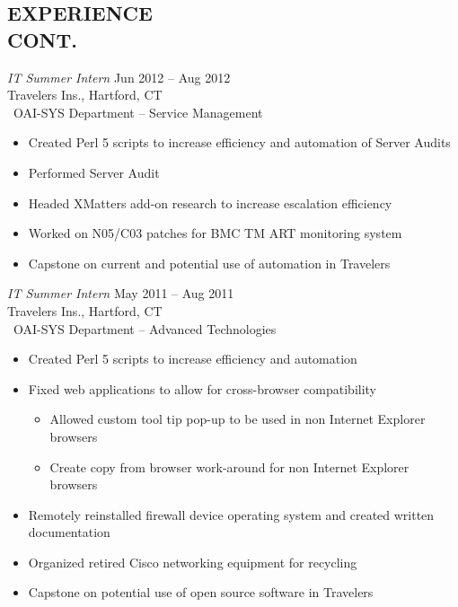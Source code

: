 \documentclass[margin]{res}
\begin{document}
\begin{resume}
\newpage

   \section{EXPERIENCE \\ CONT.}
   {\sl IT Summer Intern} \hfill Jun 2012 -- Aug 2012 \\
   Travelers Ins., Hartford, CT\\\
   OAI-SYS Department -- Service Management
   \begin{itemize} %
      \item Created Perl 5 scripts to increase efficiency and
         automation of Server Audits
   \end{itemize}
   \begin{itemize}
      \item Performed Server Audit
      \item Headed XMatters add-on research to increase escalation
         efficiency
      \item Worked on N05/C03 patches for BMC TM ART monitoring
         system
      \item Capstone on current and potential use of
         automation in Travelers
   \end{itemize}
   
   {\sl IT Summer Intern} \hfill  May 2011 -- Aug 2011 \\
   Travelers Ins., Hartford, CT\\\
   OAI-SYS Department -- Advanced Technologies
   \begin{itemize}   %
      \item Created Perl 5 scripts to increase efficiency and
         automation
      \item Fixed web applications to allow for cross-browser
         compatibility
         \begin{itemize} %
            \item Allowed custom tool tip pop-up to be used in non
               Internet Explorer \\
               browsers
            \item Create copy from browser work-around for non
               Internet Explorer \\
               browsers
         \end{itemize}
      \item Remotely reinstalled firewall device operating
         system and created written \\
         documentation
      \item Organized retired Cisco networking equipment for
         recycling
      \item Capstone on potential use of open source software
         in Travelers
   \end{itemize}

\end{resume}
\end{document}

